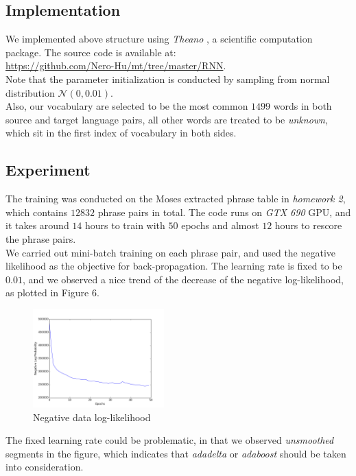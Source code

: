 \documentclass[11pt,letterpaper]{article}
\begin{document}
\subsection{Implementation} %
\label{sub:theano}
We implemented above structure using \textit{Theano} \cite{theano}, a scientific computation package. The source code is available at:\\
\url{https://github.com/Nero-Hu/mt/tree/master/RNN}.\\
Note that the parameter initialization is conducted by sampling from normal distribution $\mathcal{N}(0,0.01)$.\\
Also, our vocabulary are selected to be the most common $1499$ words in both source and target language pairs, all other words are treated to be \textit{unknown}, which sit in the first index of vocabulary in both sides.

\subsection{Experiment} %
\label{sub:experiment}
The training was conducted on the Moses extracted phrase table in \textit{homework 2}, which contains $12832$ phrase pairs in total. The code runs on \textit{GTX 690} GPU, and it takes around $14$ hours to train with $50$ epochs and almost $12$ hours to rescore the phrase pairs.\\
We carried out mini-batch training on each phrase pair, and used the negative likelihood as the objective for back-propagation. The learning rate is fixed to be $0.01$, and we observed a nice trend of the decrease of the negative log-likelihood, as plotted in Figure 6.
\begin{figure}[!htb]
	\centering
    \includegraphics[width=0.45\textwidth]{logprob.png}
    \caption{Negative data log-likelihood}
\end{figure}
The fixed learning rate could be problematic, in that we observed \textit{unsmoothed} segments in the figure, which indicates that \textit{adadelta} or \textit{adaboost} should be taken into consideration.
\end{document}
